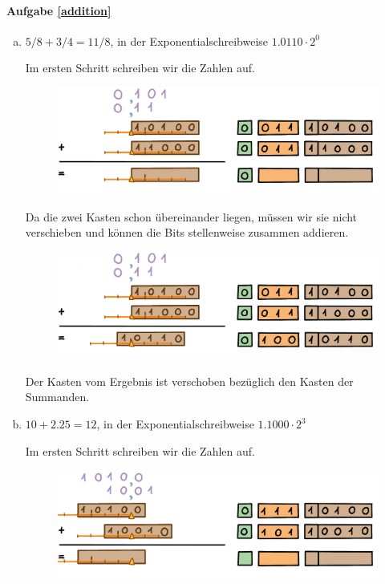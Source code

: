 \paragraph{Aufgabe \ref{addition}}
\begin{enumerate}[(a)]
\item \(5/8 + 3/4 = 11/8\), in der Exponentialschreibweise \(1.0110 \cdot 2^{0}\)

Im ersten Schritt schreiben wir die Zahlen auf.
\begin{figure}[H]
\centering
\includegraphics[width=\linewidth]{Pictures/Addition5-8and3-4_1.png}
\end{figure}
Da die zwei Kasten schon übereinander liegen, müssen wir sie nicht verschieben und können die Bits stellenweise zusammen addieren.
\begin{figure}[H]
\centering
\includegraphics[width=\linewidth]{Pictures/Addition5-8and3-4_2.png}
\end{figure}
Der Kasten vom Ergebnis ist verschoben bezüglich den Kasten der Summanden.

\item \(10 + 2.25 = 12\), in der Exponentialschreibweise \(1.1000 \cdot 2^3\)

Im ersten Schritt schreiben wir die Zahlen auf.
\begin{figure}[H]
\centering
\includegraphics[width=\linewidth]{Pictures/Addition10and2-25_1.png}
\end{figure}


\end{enumerate}
